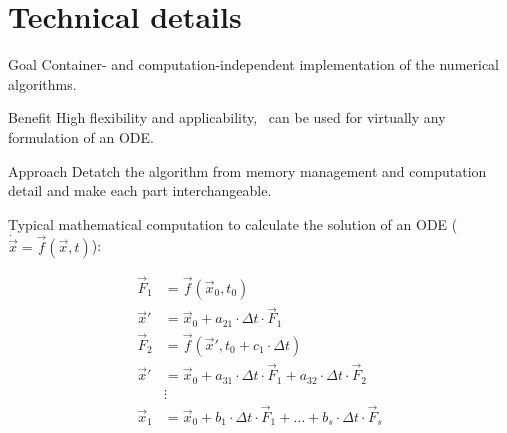 \section{Technical details}


\begin{frame}
  \tableofcontents[currentsection] 
\end{frame}

\begin{frame}

\begin{block}{Goal}
 Container- and computation-independent implementation of the numerical algorithms.  
\end{block}

\begin{block}{Benefit}
 High flexibility and applicability, \odeint\ can be used for virtually any formulation of an ODE.
\end{block}
 
\begin{block}{Approach}
 Detatch the algorithm from memory management and computation detail and make each part interchangeable.
\end{block}

\end{frame}

\begin{frame}

 Typical mathematical computation to calculate the solution of an ODE ($\dot{\vec x} = \vec f(\vec x , t)$):

\begin{align*}
 \vec F_1 &= \vec f( \vec x_0 , t_0 ) \\
 \vec x' &= \vec x_0 + a_{21} \cdot \Delta t \cdot \vec F_1 \\
 \vec F_2 &= \vec f( \vec x' , t_0 + c_1\cdot\Delta t ) \\
 \vec x' &= \vec x_0 + a_{31} \cdot \Delta t \cdot \vec F_1 + a_{32} \cdot \Delta t \cdot \vec F_2 \\
         &\vdots \\
 \vec x_1 &= \vec x_0 + b_1\cdot \Delta t \cdot \vec F_1 + \dots + b_s\cdot \Delta t \cdot \vec F_s
\end{align*} 

\end{frame}

